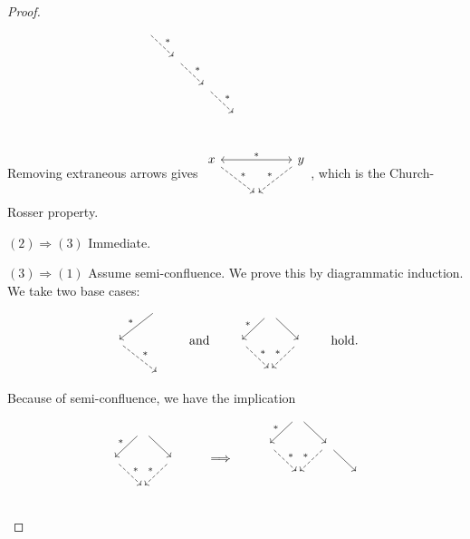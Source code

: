 \begin{proof}
\[\begin{tikzcd}[column sep=1.5em, row sep=1.5em]
{}&{}\arrow[dr, dashed, "{*}"]&{}&{}&{}&{}&{}&{}&{} \\
{}&{}&{}\arrow[dr, dashed, "{*}"]&{}&{}&{}&{}&{}&{} \\
{}&{}&{}&{}\arrow[dr, dashed, "{*}"]&{}&{}&{}&{}&{} \\
{}&{}&{}&{}&{}&{}&{}&{}&{} \\
\end{tikzcd} \]
Removing extraneous arrows gives $\begin{tikzcd}
x \arrow[rr, leftrightarrow, "{*}"] \arrow[dr, dashed, "{*}"] &{}& y \arrow[dl, dashed, swap, "{*}"] \\
{} & {} & {}
\end{tikzcd}$, which is the Church-Rosser property.

$(2) \Rightarrow (3)$ Immediate.

$(3) \Rightarrow (1)$ Assume semi-confluence. We prove this by diagrammatic induction. We take two base cases:
\[ \begin{tikzcd}
{} & {} \arrow[dl, swap, "{*}"] \\
{} \arrow[dr, dashed, "{*}"] & {} \\
{}&{}
\end{tikzcd} \qquad\text{and}\qquad \begin{tikzcd}[column sep=1.5em, row sep=1.5em]
{} & {} \arrow[dl, swap, "{*}"] \arrow[dr] & {} \\
{} \arrow[dr, dashed, "{*}"] & {} & {} \arrow[dl, swap, dashed, "{*}"] \\
{}&{}&{} 
\end{tikzcd} \qquad \text{hold.} \]
Because of semi-confluence, we have the implication
\begin{align*}
\begin{tikzcd}[column sep=1.5em, row sep=1.5em, ampersand replacement=\&]
{} \& \arrow[dl, swap, "{*}"] {} \arrow[dr] \& {} \\
{} \arrow[dr, dashed, "{*}"] \& {} \& \arrow[dl, dashed, swap, "{*}"] {} \\
{} \& {} \& {}
\end{tikzcd} \qquad&\implies\qquad \begin{tikzcd}[column sep=1.5em, row sep=1.5em, ampersand replacement=\&]
{} \& \arrow[dl, swap, "{*}"] {} \arrow[dr] \& {} \& {} \\
{} \arrow[dr, dashed, "{*}"] \& {} \& \arrow[dl, dashed, swap, "{*}"] \arrow[dr] {} \& {} \\
{} \& {} \& {} \& {} \\
{} \& {} \& {} \& {}
\end{tikzcd} \\

\end{align*}
\end{proof}
